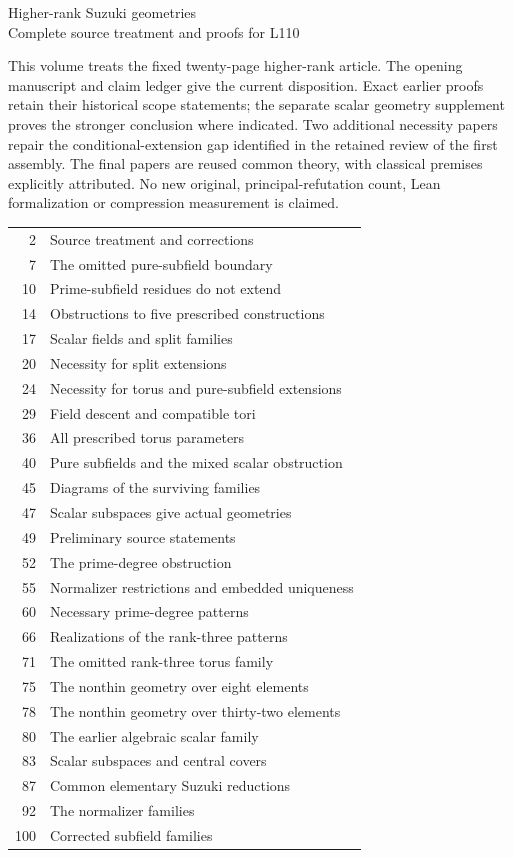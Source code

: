 \documentclass[11pt,a4paper]{article}
\begin{document}
\begin{center}{\Large Higher-rank Suzuki geometries}\\[4mm]
{\large Complete source treatment and proofs for L110}\end{center}
This volume treats the fixed twenty-page higher-rank article. The opening
manuscript and claim ledger give the current disposition. Exact earlier
proofs retain their historical scope statements; the separate scalar
geometry supplement proves the stronger conclusion where indicated.
Two additional necessity papers repair the conditional-extension gap
identified in the retained review of the first assembly.
The final papers are reused common theory, with classical premises
explicitly attributed. No new original, principal-refutation count,
Lean formalization or compression measurement is claimed.\par\medskip
\small\begin{tabular}{rl}
2 & Source treatment and corrections\\
7 & The omitted pure-subfield boundary\\
10 & Prime-subfield residues do not extend\\
14 & Obstructions to five prescribed constructions\\
17 & Scalar fields and split families\\
20 & Necessity for split extensions\\
24 & Necessity for torus and pure-subfield extensions\\
29 & Field descent and compatible tori\\
36 & All prescribed torus parameters\\
40 & Pure subfields and the mixed scalar obstruction\\
45 & Diagrams of the surviving families\\
47 & Scalar subspaces give actual geometries\\
49 & Preliminary source statements\\
52 & The prime-degree obstruction\\
55 & Normalizer restrictions and embedded uniqueness\\
60 & Necessary prime-degree patterns\\
66 & Realizations of the rank-three patterns\\
71 & The omitted rank-three torus family\\
75 & The nonthin geometry over eight elements\\
78 & The nonthin geometry over thirty-two elements\\
80 & The earlier algebraic scalar family\\
83 & Scalar subspaces and central covers\\
87 & Common elementary Suzuki reductions\\
92 & The normalizer families\\
100 & Corrected subfield families\\
\end{tabular}\newpage
\end{document}
